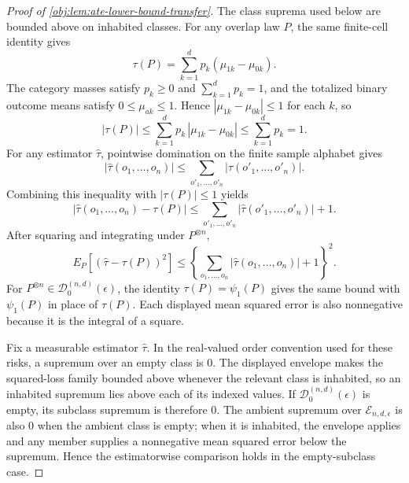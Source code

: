 \begin{proof}[Proof of \cref{obj:lem:ate-lower-bound-transfer}]
The class suprema used below are bounded above on inhabited classes.  For any overlap law \(P\), the same finite-cell identity gives
\[
\tau(P)=\sum_{k=1}^d p_k(\mu_{1k}-\mu_{0k}).
\]
The category masses satisfy \(p_k\ge0\) and \(\sum_{k=1}^d p_k=1\), and the totalized binary outcome means satisfy \(0\le\mu_{ak}\le1\).  Hence \(|\mu_{1k}-\mu_{0k}|\le1\) for each \(k\), so
\[
|\tau(P)|
\le
\sum_{k=1}^d p_k\,|\mu_{1k}-\mu_{0k}|
\le
\sum_{k=1}^d p_k
=
1.
\]
For any estimator \(\widehat\tau\), pointwise domination on the finite sample alphabet gives
\[
|\widehat\tau(o_1,\ldots,o_n)|
\le
\sum_{o'_1,\ldots,o'_n}|\widehat\tau(o'_1,\ldots,o'_n)|.
\]
Combining this inequality with \(|\tau(P)|\le1\) yields
\[
|\widehat\tau(o_1,\ldots,o_n)-\tau(P)|
\le
\sum_{o'_1,\ldots,o'_n}|\widehat\tau(o'_1,\ldots,o'_n)|+1.
\]
After squaring and integrating under \(P^{\otimes n}\),
\[
E_P\!\left[(\widehat\tau-\tau(P))^2\right]
\le
\left\{\sum_{o_1,\ldots,o_n}|\widehat\tau(o_1,\ldots,o_n)|+1\right\}^2.
\]
For \(P^{\otimes n}\in\mathcal D_0^{(n,d)}(\epsilon)\), the identity \(\tau(P)=\psi_1(P)\) gives the same bound with \(\psi_1(P)\) in place of \(\tau(P)\).  Each displayed mean squared error is also nonnegative because it is the integral of a square.

Fix a measurable estimator \(\widehat\tau\).  In the real-valued order convention used for these risks, a supremum over an empty class is \(0\).  The displayed envelope makes the squared-loss family bounded above whenever the relevant class is inhabited, so an inhabited supremum lies above each of its indexed values.  If \(\mathcal D_0^{(n,d)}(\epsilon)\) is empty, its subclass supremum is therefore \(0\).  The ambient supremum over \(\mathcal E_{n,d,\epsilon}\) is also \(0\) when the ambient class is empty; when it is inhabited, the envelope applies and any member supplies a nonnegative mean squared error below the supremum.  Hence the estimatorwise comparison holds in the empty-subclass case.


\end{proof}
